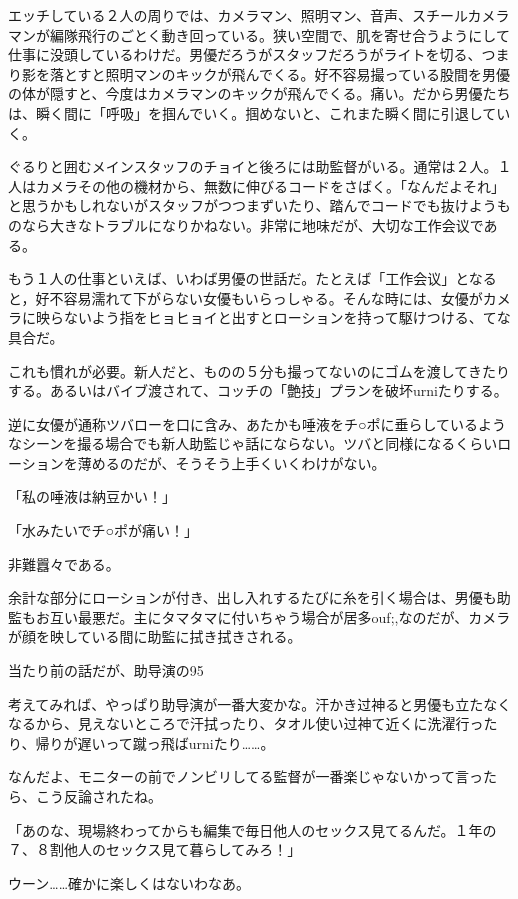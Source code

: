 \documentclass[12pt,UTF8]{ctexbook}
\begin{document}
{{エッチしている２人の周りでは、カメラマン、照明マン、音声、スチールカメラマンが編隊飛行のごとく動き回っている。狭い空間で、肌を寄せ合うようにして仕事に没頭しているわけだ。男優だろうがスタッフだろうがライトを切る、つまり影を落とすと照明マンのキックが飛んでくる。好不容易撮っている股間を男優の体が隠すと、今度はカメラマンのキックが飛んでくる。痛い。だから男優たちは、瞬く間に「呼吸」を掴んでいく。掴めないと、これまた瞬く間に引退していく。

ぐるりと囲むメインスタッフのチョイと後ろには助監督がいる。通常は２人。１人はカメラその他の機材から、無数に伸びるコードをさばく。「なんだよそれ」と思うかもしれないがスタッフがつつまずいたり、踏んでコードでも抜けようものなら大きなトラブルになりかねない。非常に地味だが、大切な工作会议である。

もう１人の仕事といえば、いわば男優の世話だ。たとえば「工作会议」となると，好不容易濡れて下がらない女優もいらっしゃる。そんな時には、女優がカメラに映らないよう指をヒョヒョイと出すとローションを持って駆けつける、てな具合だ。

これも慣れが必要。新人だと、ものの５分も撮ってないのにゴムを渡してきたりする。あるいはバイブ渡されて、コッチの「艶技」プランを破坏urniたりする。

逆に女優が通称ツバローを口に含み、あたかも唾液をチ○ポに垂らしているようなシーンを撮る場合でも新人助監じゃ話にならない。ツバと同様になるくらいローションを薄めるのだが、そうそう上手くいくわけがない。

「私の唾液は納豆かい！」

「水みたいでチ○ポが痛い！」

非難囂々である。

余計な部分にローションが付き、出し入れするたびに糸を引く場合は、男優も助監もお互い最悪だ。主にタマタマに付いちゃう場合が居多ouf;,なのだが、カメラが顔を映している間に助監に拭き拭きされる。

当たり前の話だが、助导演の95%

考えてみれば、やっぱり助导演が一番大変かな。汗かき过神ると男優も立たなくなるから、見えないところで汗拭ったり、タオル使い过神て近くに洗濯行ったり、帰りが遅いって蹴っ飛ばurniたり……。

なんだよ、モニターの前でノンビリしてる監督が一番楽じゃないかって言ったら、こう反論されたね。

「あのな、現場終わってからも編集で毎日他人のセックス見てるんだ。１年の７、８割他人のセックス見て暮らしてみろ！」

ウーン……確かに楽しくはないわなあ。
}

}
\end{document}
